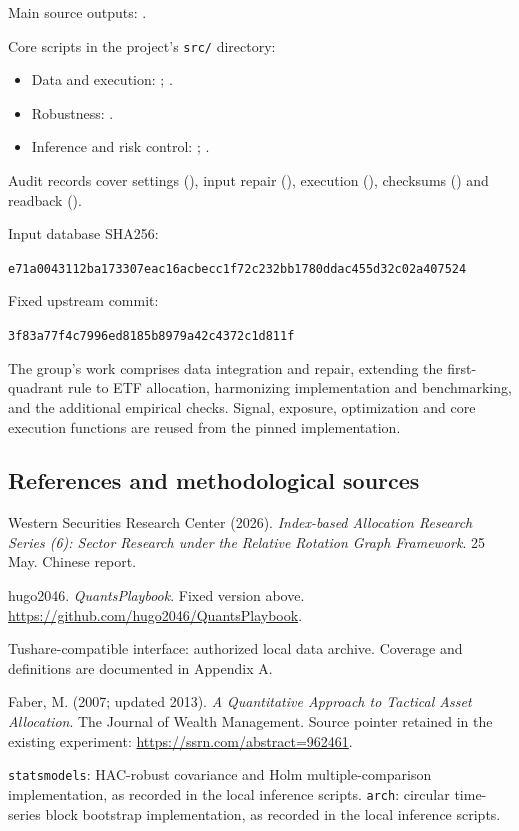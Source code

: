 Main source outputs: .

Core scripts in the project's \texttt{src/} directory:
\begin{itemize}
\item Data and execution: ; .
\item Robustness: .
\item Inference and risk control: ; .
\end{itemize}
Audit records cover settings (), input repair (), execution (), checksums () and readback ().

Input database SHA256:\par
{\scriptsize\texttt{e71a0043112ba173307eac16acbecc1f72c232bb1780ddac455d32c02a407524}}\par
Fixed upstream commit:\par
{\scriptsize\texttt{3f83a77f4c7996ed8185b8979a42c4372c1d811f}}\par
The group's work comprises data integration and repair, extending the first-quadrant rule to ETF allocation, harmonizing implementation and benchmarking, and the additional empirical checks. Signal, exposure, optimization and core execution functions are reused from the pinned implementation.

\subsection*{References and methodological sources}
Western Securities Research Center (2026). \emph{Index-based Allocation Research Series (6): Sector Research under the Relative Rotation Graph Framework}. 25 May. Chinese report.

hugo2046. \emph{QuantsPlaybook}. Fixed version above. \url{https://github.com/hugo2046/QuantsPlaybook}.

Tushare-compatible interface: authorized local data archive. Coverage and definitions are documented in Appendix A.

Faber, M. (2007; updated 2013). \emph{A Quantitative Approach to Tactical Asset Allocation}. The Journal of Wealth Management. Source pointer retained in the existing experiment: \url{https://ssrn.com/abstract=962461}.

\texttt{statsmodels}: HAC-robust covariance and Holm multiple-comparison implementation, as recorded in the local inference scripts. \texttt{arch}: circular time-series block bootstrap implementation, as recorded in the local inference scripts.


